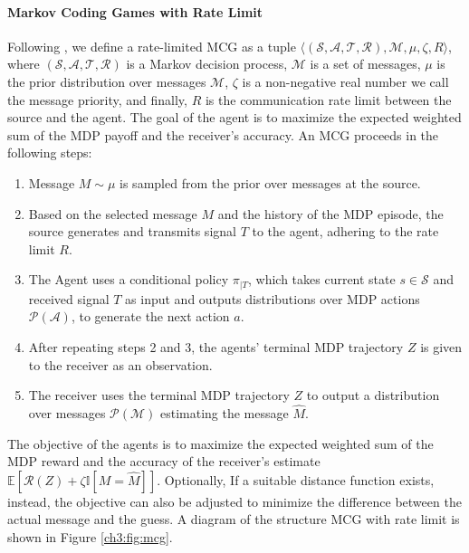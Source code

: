 \paragraph{Markov Coding Games with Rate Limit} 
Following \cite{sokota2022communicating}, we define a rate-limited MCG as a tuple $\langle (\mathcal{S},  \mathcal{A}, \mathcal{T}, \mathcal{R}), \mathcal{M}, \mu, \zeta, R \rangle$, where \((\mathcal{S}, \mathcal{A}, \mathcal{T}, \mathcal{R})\) is a Markov decision process, \(\mathcal{M}\) is a set of messages, \(\mu\) is the prior distribution over messages \(\mathcal{M}\), \(\zeta\) is a non-negative real number we call the message priority, and finally, $R$ is the communication rate limit between the source and the agent. The goal of the agent is to maximize the expected weighted sum of the MDP payoff and the receiver’s accuracy. An MCG proceeds in the following steps:
\begin{enumerate}
    \item  Message \(M \sim \mu\) is sampled from the prior over messages at the source.
    \item Based on the selected message $M$ and the history of the MDP episode, the source generates and transmits signal $T$ to the agent, adhering to the rate limit $R$.
    \item The Agent uses a conditional policy $\pi_{|T}$, which takes current state \(s \in \mathcal{S}\) and received signal \(T \) as input and outputs distributions over MDP actions \(\mathcal{P}(\mathcal{A})\), to generate the next action $a$. 
    \item After repeating steps 2 and 3, the agents’ terminal MDP trajectory \(Z\) is given to the receiver as an observation.
    \item The receiver uses the terminal MDP trajectory $Z$ to output a distribution over messages \(\mathcal{P}(\mathcal{M})\) estimating the message \(\hat{M}\).
\end{enumerate}

The objective of the agents is to maximize the expected weighted sum of the MDP reward and the accuracy of the receiver’s estimate \(\mathbb{E} [\mathcal{R}(Z) + \zeta\mathbb{I}[M = \hat{M}] ]\). Optionally,
If a suitable distance function exists, instead, the objective can also be adjusted to minimize the difference between the actual message and the guess. A diagram of the structure MCG with rate limit is shown in Figure \ref{ch3:fig:mcg}.

